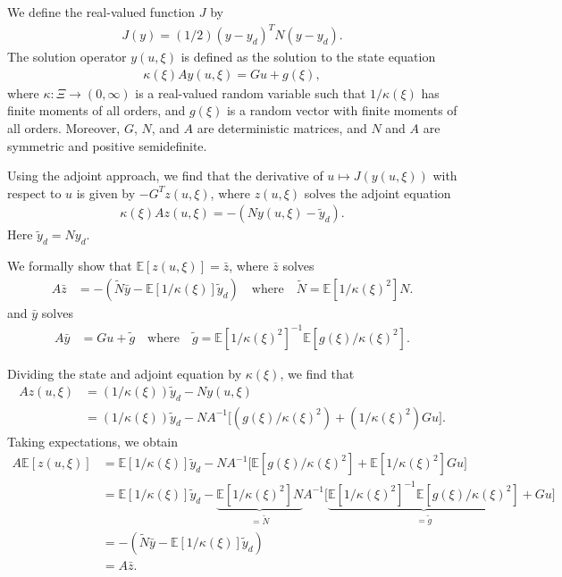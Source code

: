\documentclass{article}
\newcommand{\cE}[1]{\mathbb{E}[#1]}
\newcommand{\pobj}{J}
\begin{document}
We define the real-valued function $\pobj$ by
\begin{align*}
	\pobj(y) = 
	(1/2)(y-y_d)^T N (y-y_d).
\end{align*}
The solution operator $y(u,\xi)$ 
is defined as the solution to
the state equation
\begin{align*}
	\kappa(\xi) A y(u,\xi) = Gu + g(\xi),
\end{align*}
where 
$\kappa : \Xi \to (0,\infty)$ is a real-valued random variable
such that $1/\kappa(\xi)$ has finite moments of all orders, 
and $g(\xi)$ is a random vector with finite moments
of all orders.
Moreover, $G$, $N$, and $A$ are deterministic matrices, and
$N$ and $A$ are symmetric and positive semidefinite.


Using the adjoint approach, we find that
the derivative of $u \mapsto \pobj(y(u,\xi))$
with respect to $u$ is given by
$-G^Tz(u,\xi)$, where $z(u,\xi)$ solves
the adjoint equation
\begin{align*}
	\kappa(\xi) A z(u,\xi) = - (Ny(u,\xi)-\widetilde{y}_d).
\end{align*}
Here $\widetilde{y}_d = Ny_d$.


We formally show that $\cE{z(u,\xi)} = \bar{z}$, 
where $\bar{z}$ solves
\begin{align*}
	A \bar{z} &
	= - (\widetilde{N}\bar{y} - \cE{1/\kappa(\xi)}\widetilde{y}_d)
	\quad 
	\text{where}
	\quad 
	\widetilde{N} = \cE{1/\kappa(\xi)^2} N. 
\end{align*}
and $\bar{y}$ solves
\begin{align*}
	A \bar{y}
	&= G u + \widetilde{g}
	\quad \text{where}
	\quad \widetilde{g}
	= \cE{1/\kappa(\xi)^2}^{-1} \cE{g(\xi)/\kappa(\xi)^2}.
\end{align*}


Dividing the state and adjoint equation by $\kappa(\xi)$, we find that
\begin{align*}
	A z(u,\xi) 
	& =  (1/\kappa(\xi)) \widetilde{y}_d  - Ny(u,\xi) \\
	& =  (1/\kappa(\xi)) \widetilde{y}_d 
	- N A^{-1}\Big[(g(\xi)/\kappa(\xi)^2)+
	(1/\kappa(\xi)^2)G u\Big]. 
\end{align*}
Taking expectations, we obtain 
\begin{align*}
	A \cE{z(u,\xi)}
	& =\cE{1/\kappa(\xi)} \widetilde{y}_d  
	- N A^{-1}\Big[\cE{g(\xi)/\kappa(\xi)^2}+
	\cE{1/\kappa(\xi)^2}Gu\Big] \\
	& =\cE{1/\kappa(\xi)} \widetilde{y}_d  
	- \underbrace{\cE{1/\kappa(\xi)^2} N}_{=\widetilde{N}} 
	A^{-1} \Big[
	\underbrace{\cE{1/\kappa(\xi)^2}^{-1}
		\cE{g(\xi)/\kappa(\xi)^2}}_{=\widetilde{g}}+
	Gu\Big] \\
	& = - (\widetilde{N}\bar{y} - \cE{1/\kappa(\xi)}\widetilde{y}_d)
	\\
	& = A \bar{z}.
\end{align*}
\end{document}

